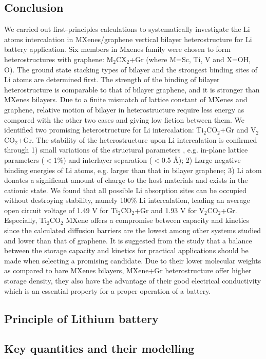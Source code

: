 \subsection{Conclusion}
We carried out first-principles calculations to systematically investigate the Li atoms intercalation in MXenes/graphene vertical bilayer heterostructure for Li battery application. Six members in Mxenes family were chosen to form heterostructures with graphene: M$_2$CX$_2$+Gr (where M=Sc, Ti, V and X=OH, O). The ground state stacking types of bilayer and the strongest binding sites of Li atoms are determined first. The strength of the binding of bilayer heterostructure is comparable to that of bilayer graphene, and it is stronger than MXenes bilayers. Due to a finite mismatch of lattice constant of MXenes and graphene, relative motion of bilayer in heterostructure require less energy as compared with the other two cases and giving low fiction between them. We identified two promising heterostructure for Li intercalation: Ti$_2$CO$_2$+Gr and V$_2$CO$_2$+Gr. The stability of the heterostructure upon Li intercalation is confirmed through 1) small variations of the structural parameters , e.g. in-plane lattice parameters ($<$1\%) and interlayer separation ($<$0.5 {\AA}); 2) Large negative binding energies of Li atoms, e.g. larger than that in bilayer graphene; 3) Li atom donates a significant amount of charge to the host materials and exists in the cationic state. We found that all possible Li absorption sites can be occupied without destroying stability, namely 100\% Li intercalation, leading an average open circuit voltage of 1.49 V for Ti$_2$CO$_2$+Gr and 1.93 V for V$_2$CO$_2$+Gr. Especially, Ti$_2$CO$_2$ MXene offers a compromise between capacity and kinetics since the calculated diffusion barriers are the lowest among other systems studied and lower than that of graphene.  It is suggested from the study that a balance between the storage capacity and kinetics for practical applications should be made when selecting a promising candidate. Due to their lower molecular weights as compared to bare MXenes bilayers,  MXene+Gr heterostructure offer higher storage density, they also have the advantage of their good electrical conductivity which is an essential property for a proper operation of a battery. 

\subsection{Principle of Lithium battery}
\subsection{Key quantities and their modelling}